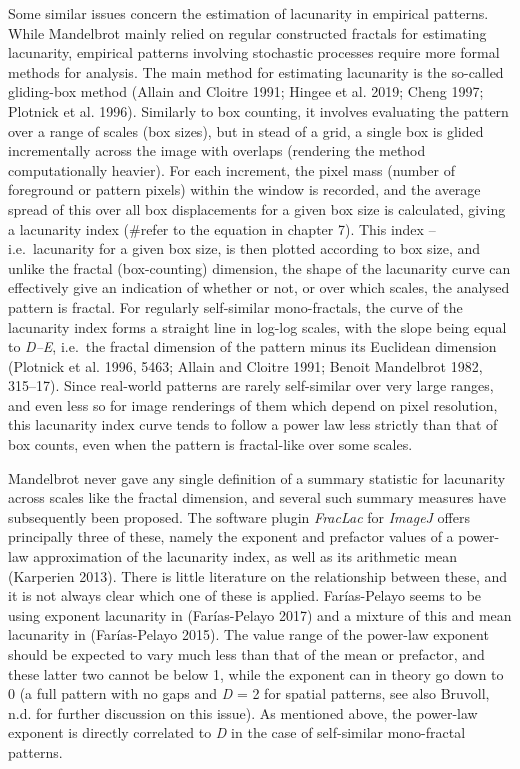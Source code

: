 \documentclass[
  12pt,
  a4paper, twoside]{book}
\begin{document}
Some similar issues concern the estimation of lacunarity in empirical patterns. While Mandelbrot mainly relied on regular constructed fractals for estimating lacunarity, empirical patterns involving stochastic processes require more formal methods for analysis. The main method for estimating lacunarity is the so-called gliding-box method (Allain and Cloitre 1991; Hingee et al. 2019; Cheng 1997; Plotnick et al. 1996). Similarly to box counting, it involves evaluating the pattern over a range of scales (box sizes), but in stead of a grid, a single box is glided incrementally across the image with overlaps (rendering the method computationally heavier). For each increment, the pixel mass (number of foreground or pattern pixels) within the window is recorded, and the average spread of this over all box displacements for a given box size is calculated, giving a lacunarity index (\#refer to the equation in chapter 7). This index -- i.e.~lacunarity for a given box size, is then plotted according to box size, and unlike the fractal (box-counting) dimension, the shape of the lacunarity curve can effectively give an indication of whether or not, or over which scales, the analysed pattern is fractal. For regularly self-similar mono-fractals, the curve of the lacunarity index forms a straight line in log-log scales, with the slope being equal to \emph{D--E}, i.e.~the fractal dimension of the pattern minus its Euclidean dimension (Plotnick et al. 1996, 5463; Allain and Cloitre 1991; Benoit Mandelbrot 1982, 315--17). Since real-world patterns are rarely self-similar over very large ranges, and even less so for image renderings of them which depend on pixel resolution, this lacunarity index curve tends to follow a power law less strictly than that of box counts, even when the pattern is fractal-like over some scales.

Mandelbrot never gave any single definition of a summary statistic for lacunarity across scales like the fractal dimension, and several such summary measures have subsequently been proposed. The software plugin \emph{FracLac} for \emph{ImageJ} offers principally three of these, namely the exponent and prefactor values of a power-law approximation of the lacunarity index, as well as its arithmetic mean (Karperien 2013). There is little literature on the relationship between these, and it is not always clear which one of these is applied. Farías-Pelayo seems to be using exponent lacunarity in (Farías-Pelayo 2017) and a mixture of this and mean lacunarity in (Farías-Pelayo 2015). The value range of the power-law exponent should be expected to vary much less than that of the mean or prefactor, and these latter two cannot be below 1, while the exponent can in theory go down to 0 (a full pattern with no gaps and \emph{D} = 2 for spatial patterns, see also Bruvoll, n.d. for further discussion on this issue). As mentioned above, the power-law exponent is directly correlated to \emph{D} in the case of self-similar mono-fractal patterns.
\end{document}

